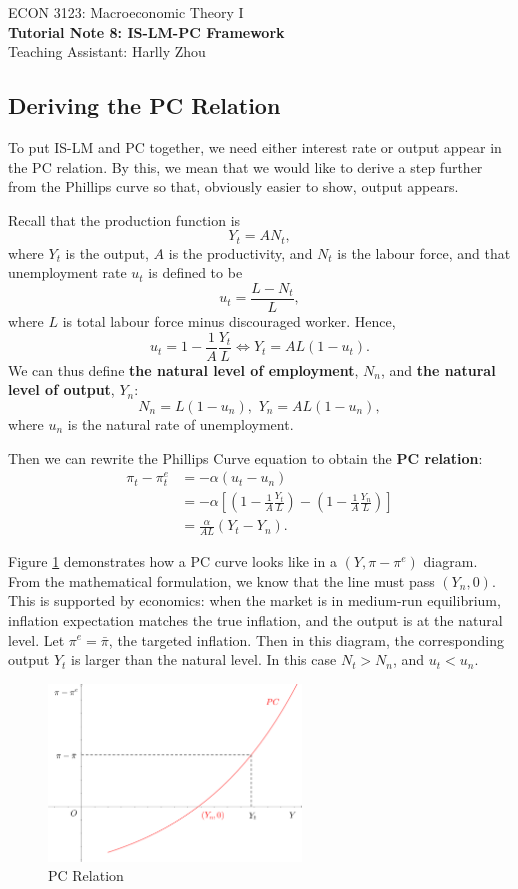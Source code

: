 \documentclass[12pt]{article}
\begin{document}
\begin{center}
    ECON 3123: Macroeconomic Theory I\\
    {\large \textbf{Tutorial Note 8: IS-LM-PC Framework}}\\
    Teaching Assistant: Harlly Zhou
\end{center}

\subsection*{Deriving the PC Relation}
To put IS-LM and PC together, we need either interest rate or output appear in the PC relation. By this, we mean that we would like to derive a step further from the Phillips curve so that, obviously easier to show, output appears.

Recall that the production function is
\[Y_t = A N_t,\]
where $Y_t$ is the output, $A$ is the productivity, and $N_t$ is the labour force, and that unemployment rate $u_t$ is defined to be
\[u_t = \frac{L-N_t}{L},\]
where $L$ is total labour force minus discouraged worker.
Hence,
\[u_t = 1-\frac{1}{A}\frac{Y_t}{L} \iff Y_t = AL(1-u_t).\]
We can thus define \textbf{the natural level of employment}, $N_n$, and \textbf{the natural level of output}, $Y_n$:
\[N_n = L(1-u_n),\,\, Y_n = AL(1-u_n),\]
where $u_n$ is the natural rate of unemployment.

Then we can rewrite the Phillips Curve equation to obtain the \textbf{PC relation}:
\begin{align*}
    \pi_t - \pi_t^e &= -\alpha (u_t - u_n)\\
    &= -\alpha\left[\left(1-\frac{1}{A}\frac{Y_t}{L}\right) - \left(1-\frac{1}{A}\frac{Y_n}{L}\right)\right]\\
    &= \frac{\alpha}{AL}(Y_t - Y_n).
\end{align*}

Figure \ref{fig:pc01} demonstrates how a PC curve looks like in a $(Y, \pi-\pi^e)$ diagram. From the mathematical formulation, we know that the line must pass $(Y_n,0)$. This is supported by economics: when the market is in medium-run equilibrium, inflation expectation matches the true inflation, and the output is at the natural level. Let $\pi^e=\bar{\pi}$, the targeted inflation. Then in this diagram, the corresponding output $Y_t$ is larger than the natural level. In this case $N_t > N_n$, and $u_t < u_n$.
\begin{figure}[htp]
    \centering
    \includegraphics[width=0.6\textwidth]{pc01.png}
    \caption{PC Relation}
    \label{fig:pc01}
\end{figure}
\end{document}

